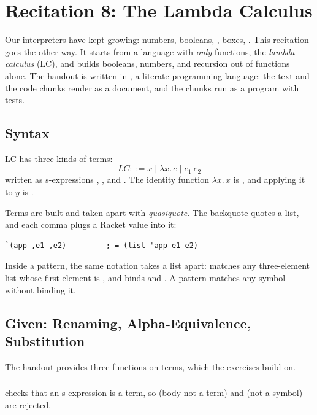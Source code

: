 \section{Recitation 8: The Lambda Calculus}
\label{sec:rec8}

Our interpreters have kept growing: numbers, booleans, , boxes, . This recitation goes the other way. It starts from a language with \emph{only} functions, the \emph{lambda calculus} (LC), and builds booleans, numbers, and recursion out of functions alone. The handout  is written in , a literate-programming language: the text and the code chunks render as a document, and the chunks run as a program with  tests.

\subsection{Syntax}

LC has three kinds of terms:
\[
\mathit{LC} ::= x \mid \lambda x.\, e \mid e_1\ e_2
\]
written as s-expressions , , and . The identity function $\lambda x.\, x$ is , and applying it to $y$ is .

Terms are built and taken apart with \emph{quasiquote}. The backquote quotes a list, and each comma plugs a Racket value into it:
\begin{lstlisting}
`(app ,e1 ,e2)         ; = (list 'app e1 e2)
\end{lstlisting}
Inside a  pattern, the same notation takes a list apart:  matches any three-element list whose first element is , and binds  and . A pattern  matches any symbol without binding it.

\subsection{Given: Renaming, Alpha-Equivalence, Substitution}

The handout provides three functions on terms, which the exercises build on.

\subsubsection{} checks that an s-expression is a term, so  (body not a term) and  (not a symbol) are rejected.

